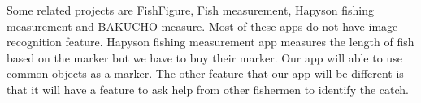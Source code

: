 Some related projects are FishFigure, Fish measurement, Hapyson fishing measurement and BAKUCHO measure. Most of these apps do not have image recognition feature. Hapyson fishing measurement app measures the length of fish based on the marker but we have to buy their marker. Our app will able to use common objects as a marker. The other feature that our app will be different is that it will have a feature to ask help from other fishermen to identify the catch.